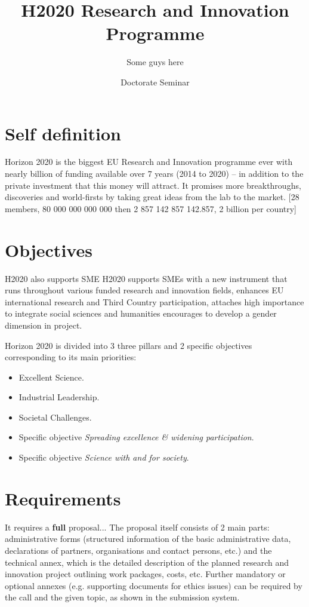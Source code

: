 \documentclass{article}
\date{Doctorate Seminar}
\begin{document}

\title{H2020 Research and Innovation Programme}
\author{Some guys here}

\maketitle
{}


\section{Self definition}
Horizon 2020 is the biggest EU Research and Innovation programme ever with nearly  billion of funding available over 7 years (2014 to 2020) – in addition to the private investment that this money will attract. It promises more breakthroughs, discoveries and world-firsts by taking great ideas from the lab to the market.
[28 members, 80 000 000 000 000 then 2 857 142 857 142.857, 2 billion per country]

\section{Objectives}
H2020 also supports SME
H2020 supports SMEs with a new instrument that runs throughout various funded research and innovation fields, enhances EU international research and Third Country participation, attaches high importance to integrate social sciences and humanities encourages to develop a gender dimension in project.

Horizon 2020 is divided into 3 three pillars and 2 specific objectives corresponding to its main priorities:

\begin{itemize}
    \item Excellent Science.
    \item Industrial Leadership.
    \item Societal Challenges.
    \item Specific objective \emph{Spreading excellence \& widening participation}.
    \item Specific objective \emph{Science with and for society}.
\end{itemize}

\section{Requirements}
It requires a \textbf{full} proposal...
The proposal itself consists of 2 main parts: administrative forms (structured information of the basic administrative data, declarations of partners, organisations and contact persons, etc.) and the technical annex, which is the detailed description of the planned research and innovation project outlining work packages, costs, etc.
Further mandatory or optional annexes (e.g. supporting documents for ethics issues) can be required by the call and the given topic, as shown in the submission system.
\end{document}
